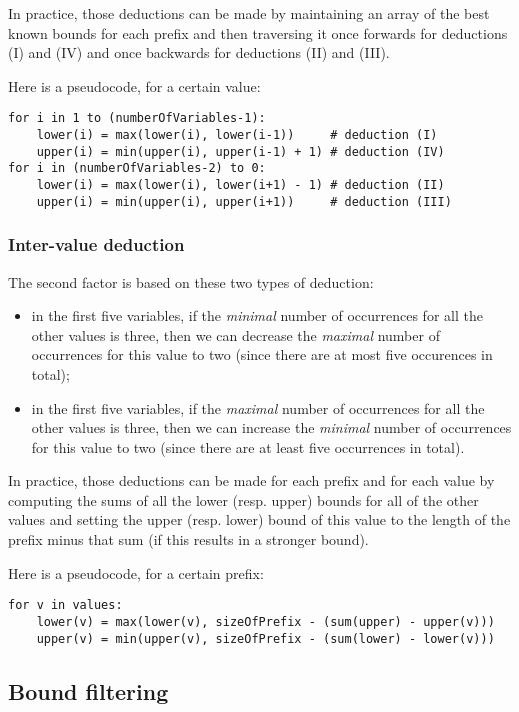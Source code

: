 \documentclass[a4paper,10pt]{article}
\begin{document}
In practice, those deductions can be made by maintaining an array of the best known bounds for each prefix and then traversing it once forwards for deductions (I) and (IV) and once backwards for deductions (II) and (III).

Here is a pseudocode, for a certain value:
\begin{lstlisting}
for i in 1 to (numberOfVariables-1):
    lower(i) = max(lower(i), lower(i-1))     # deduction (I)
    upper(i) = min(upper(i), upper(i-1) + 1) # deduction (IV)
for i in (numberOfVariables-2) to 0:
    lower(i) = max(lower(i), lower(i+1) - 1) # deduction (II)
    upper(i) = min(upper(i), upper(i+1))     # deduction (III)
\end{lstlisting}

\subsubsection{Inter-value deduction}

The second factor is based on these two types of deduction:
\begin{itemize}
    \item in the first five variables, if the \emph{minimal} number of occurrences for all the other values is three, then we can decrease the \emph{maximal} number of occurrences for this value to two (since there are at most five occurences in total);
    \item in the first five variables, if the \emph{maximal} number of occurrences for all the other values is three, then we can increase the \emph{minimal} number of occurrences for this value to two (since there are at least five occurrences in total).
\end{itemize}

In practice, those deductions can be made for each prefix and for each value by computing the sums of all the lower (resp. upper) bounds for all of the other values and setting the upper (resp. lower) bound of this value to the length of the prefix minus that sum (if this results in a stronger bound).

Here is a pseudocode, for a certain prefix:
\begin{lstlisting}
for v in values:
    lower(v) = max(lower(v), sizeOfPrefix - (sum(upper) - upper(v)))
    upper(v) = min(upper(v), sizeOfPrefix - (sum(lower) - lower(v)))
\end{lstlisting}

\subsection{Bound filtering}
\label{subsec:filtering}
\end{document}
